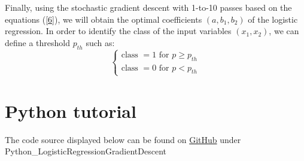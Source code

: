 \documentclass{article}
\begin{document}
Finally, using the stochastic gradient descent with 1-to-10 passes based on the equations (\ref{6}), we will obtain the optimal coefficients \((a, b_{1}, b_{2})\) of the logistic regression. In order to identify the class of the input variables \((x_{1}, x_{2})\), we can define a threshold \(p_{th}\) such as:
\begin{equation}
    \begin{cases}
    \text{class } = 1 \text{ for } p\geq p_{th} \\
    \text{class } = 0 \text{ for } p< p_{th}
    \end{cases}
\end{equation}

\newpage
\section{Python tutorial} \label{Python tutorial}
The code source displayed below can be found on \href{https://github.com/SophMarch/Tutorials}{GitHub} under Python\_LogisticRegressionGradientDescent

\end{document}
